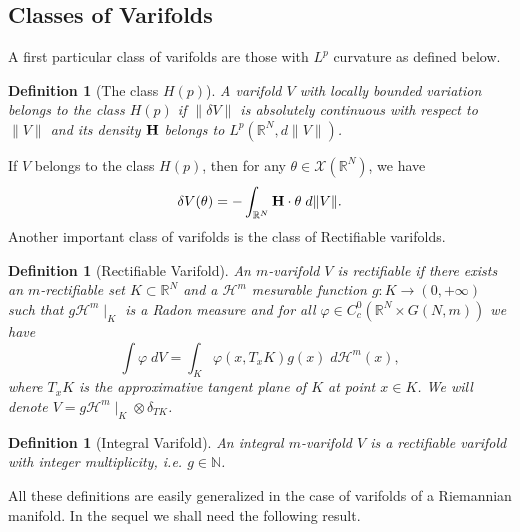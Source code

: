 \documentclass[12pt,english]{smfart} %
\newtheorem{definition}[theorem]{Definition}
\theoremstyle{remark}
\newtheorem{remark}[theorem]{Remark}
\newcommand{\R}{\mathbb{R}}
\newcommand{\N}{\mathbb{N}} %
\newcommand{\Hm}{{\bf H}}
\begin{document}







\subsection{Classes of Varifolds}


A first particular class of  varifolds  are those with  $L^p$ curvature  as defined below. 

\medskip
\begin{definition}[The class $H(p)$] A varifold $V$ with locally bounded  variation belongs to the class $H(p)$ if $\|\delta V\|$ is absolutely continuous with respect to $\|V\|$ and its density ${\bf H}$  belongs to $L^p(\mathbb{R}^N,d\|V\|)$.
\end{definition}

If $V$ belongs to the class $H(p)$, then for any $\theta\in\mathcal{X}(\R^N)$, we have 
$$\delta V(\theta)=-\int_{\R^N}\Hm\cdot\theta \; d\|V\|.$$
Another important class of varifolds is the class of Rectifiable varifolds.

\medskip\begin{definition}[Rectifiable Varifold] An $m$-varifold $V$ is rectifiable if there exists an $m$-rectifiable set $K \subset \R^N$ and a $\mathcal{H}^m$ mesurable function $g:K \to (0,+\infty)$  such that $g\mathcal{H}^m\mid_K$ is a Radon measure and for all $\varphi \in C^0_c(\mathbb{R}^N\times G(N,m))$ we have
 $$\int \varphi \; dV = \int_{K} \varphi(x, T_xK) g(x) \;d\mathcal{H}^m(x) ,$$
 where $T_xK$ is the approximative tangent plane of $K$ at point $x\in K$. We will denote $V=g\mathcal{H}^m\mid_K\otimes\delta_{TK}$.
\end{definition}

\medskip\begin{definition}[Integral Varifold] An integral $m$-varifold $V$ is a rectifiable varifold with integer multiplicity, i.e. $g \in \N$.
\end{definition}

All these definitions are easily generalized in the case of varifolds of a Riemannian manifold. In the sequel we shall need the following result.
\end{document}
